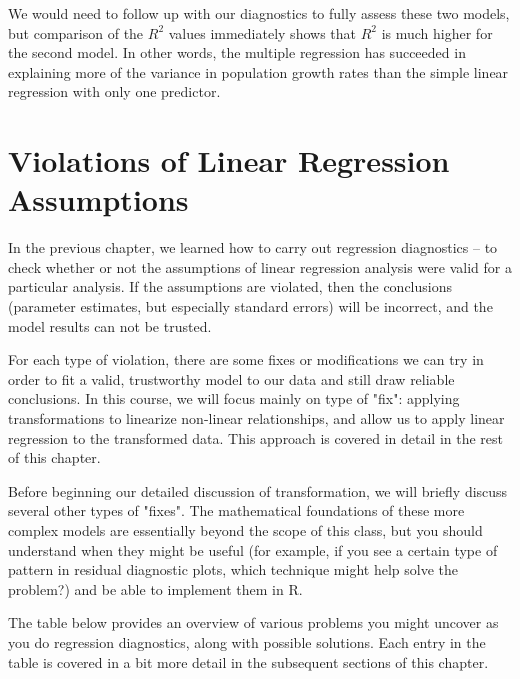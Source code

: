 \documentclass[twoside]{book}\usepackage[]{graphicx}\usepackage[]{xcolor}
\newcounter{example}[section]
\begin{document}
We would need to follow up with our diagnostics to fully assess these two models, but comparison of the $R^2$ values immediately shows that $R^2$ is much higher for the second model. In other words, the multiple regression has succeeded in explaining more of the variance in population growth rates than the simple linear regression with only one predictor.  


\section{Violations of Linear Regression Assumptions}
In the previous chapter, we learned how to carry out regression diagnostics -- to check whether or not the assumptions of linear regression analysis were valid for a particular analysis.  If the assumptions are violated, then the conclusions (parameter estimates, but especially standard errors) will be incorrect, and the model results can not be trusted.  

For each type of violation, there are some fixes or modifications we can try in order to fit a valid, trustworthy model to our data and still draw reliable conclusions.  In this course, we will focus mainly on type of "fix":  applying transformations to linearize non-linear relationships, and allow us to apply linear regression to the transformed data.  This approach is covered in detail in the rest of this chapter.

Before beginning our detailed discussion of transformation, we will briefly discuss several other types of "fixes".  The mathematical foundations of these more complex models are essentially beyond the scope of this class, but you should understand when they might be useful (for example, if you see a certain type of pattern in residual diagnostic plots, which technique might help solve the problem?) and be able to implement them in R.

The table below provides an overview of various problems you might uncover as you do regression diagnostics, along with possible solutions.  Each entry in the table is covered in a bit more detail in the subsequent sections of this chapter.
\end{document}
